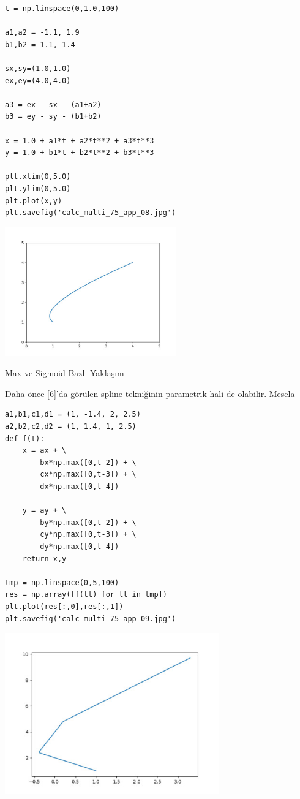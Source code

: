 \documentclass[12pt,fleqn]{article}\usepackage{../../common}
\begin{document}
\begin{verbatim}
t = np.linspace(0,1.0,100)

a1,a2 = -1.1, 1.9
b1,b2 = 1.1, 1.4

sx,sy=(1.0,1.0)
ex,ey=(4.0,4.0)

a3 = ex - sx - (a1+a2)
b3 = ey - sy - (b1+b2)

x = 1.0 + a1*t + a2*t**2 + a3*t**3
y = 1.0 + b1*t + b2*t**2 + b3*t**3

plt.xlim(0,5.0)
plt.ylim(0,5.0)
plt.plot(x,y)
plt.savefig('calc_multi_75_app_08.jpg')
\end{verbatim}

\includegraphics[width=20em]{calc_multi_75_app_08.jpg}

Max ve Sigmoid Bazlı Yaklaşım

Daha önce [6]'da görülen spline tekniğinin parametrik hali de
olabilir. Mesela 

\begin{verbatim}
a1,b1,c1,d1 = (1, -1.4, 2, 2.5)
a2,b2,c2,d2 = (1, 1.4, 1, 2.5)
def f(t):
    x = ax + \
        bx*np.max([0,t-2]) + \
        cx*np.max([0,t-3]) + \
        dx*np.max([0,t-4])
	   
    y = ay + \
        by*np.max([0,t-2]) + \
        cy*np.max([0,t-3]) + \
        dy*np.max([0,t-4])
    return x,y	   
    
tmp = np.linspace(0,5,100)
res = np.array([f(tt) for tt in tmp])
plt.plot(res[:,0],res[:,1])
plt.savefig('calc_multi_75_app_09.jpg')
\end{verbatim}

\includegraphics[width=25em]{calc_multi_75_app_09.jpg}
\end{document}
